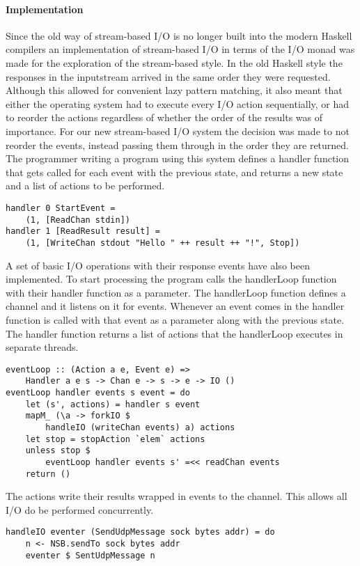 \paragraph{Implementation}
Since the old way of stream-based I/O is no longer built into the modern Haskell compilers an implementation of stream-based I/O in terms of the I/O monad was made for the exploration of the stream-based style.
In the old Haskell style the responses in the inputstream arrived in the same order they were requested. Although this allowed for convenient lazy pattern matching, it also meant that either the operating system had to execute every I/O action sequentially, or had to reorder the actions regardless of whether the order of the results was of importance. For our new stream-based I/O system the decision was made to not reorder the events, instead passing them through in the order they are returned.
The programmer writing a program using this system defines a handler function that gets called for each event with the previous state, and returns a new state and a list of actions to be performed.
\begin{lstlisting}[caption={Stream-based example}]
handler 0 StartEvent =
    (1, [ReadChan stdin])
handler 1 [ReadResult result] =
    (1, [WriteChan stdout "Hello " ++ result ++ "!", Stop])
\end{lstlisting}
A set of basic I/O operations with their response events have also been implemented.
To start processing the program calls the handlerLoop function with their handler function as a parameter.
The handlerLoop function defines a channel and it listens on it for events. Whenever an event comes in the handler function is called with that event as a parameter along with the previous state. The handler function returns a list of actions that the handlerLoop executes in separate threads. 
\begin{lstlisting}[caption={The eventLoop}]
eventLoop :: (Action a e, Event e) =>
    Handler a e s -> Chan e -> s -> e -> IO ()
eventLoop handler events s event = do
    let (s', actions) = handler s event
    mapM_ (\a -> forkIO $
        handleIO (writeChan events) a) actions
    let stop = stopAction `elem` actions
    unless stop $
        eventLoop handler events s' =<< readChan events
    return ()
\end{lstlisting}
The actions write their results wrapped in events to the channel. This allows all I/O do be performed concurrently.
\begin{lstlisting}[caption={Example of an Action, SendUdpMessage}]
handleIO eventer (SendUdpMessage sock bytes addr) = do
    n <- NSB.sendTo sock bytes addr
    eventer $ SentUdpMessage n
\end{lstlisting}
